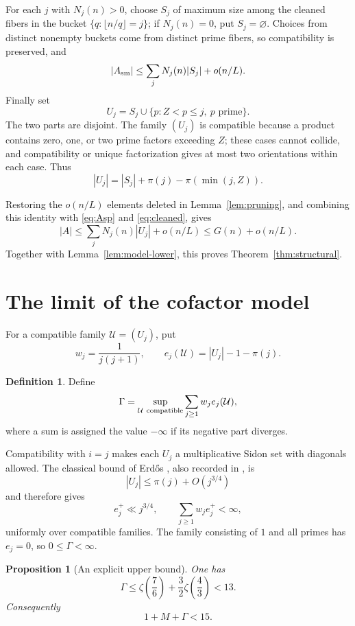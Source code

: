 \documentclass[11pt,reqno]{article}
\newtheorem{proposition}[theorem]{Proposition}
\theoremstyle{definition}
\newtheorem{definition}[theorem]{Definition}
\newcommand{\Ucal}{\mathcal U}
\begin{document}
For each \(j\) with \(N_j(n)>0\), choose \(S_j\) of maximum size among the
cleaned fibers in the bucket \(\{q:\lfloor n/q\rfloor=j\}\); if
\(N_j(n)=0\), put \(S_j=\varnothing\).  Choices from distinct nonempty
buckets come from distinct prime fibers, so compatibility is preserved, and
\[
  |A_{\rm sm}|
  \leq\sum_jN_j(n)|S_j|+o(n/L).
\]
Finally set
\[
  U_j=S_j\cup\{p:Z<p\leq j,\ p\text{ prime}\}.
\]
The two parts are disjoint.  The family \((U_j)\) is compatible because a
product contains zero, one, or two prime factors exceeding \(Z\); these
cases cannot collide, and compatibility or unique factorization gives at
most two orientations within each case.  Thus
\[
  |U_j|=|S_j|+\pi(j)-\pi(\min(j,Z)).
\]

Restoring the \(o(n/L)\) elements deleted in Lemma~\ref{lem:pruning}, and
combining this identity with \eqref{eq:Asp} and \eqref{eq:cleaned}, gives
\[
  |A|\leq\sum_jN_j(n)|U_j|+o(n/L)\leq G(n)+o(n/L).
\]
Together with Lemma~\ref{lem:model-lower}, this proves
Theorem~\ref{thm:structural}.

\section{The limit of the cofactor model}\label{sec:limit}

For a compatible family \(\Ucal=(U_j)\), put
\[
  w_j=\frac1{j(j+1)},\qquad
  e_j(\Ucal)=|U_j|-1-\pi(j).
\]

\begin{definition}\label{def:gamma}
Define
\[
  \Gamma=\sup_{\Ucal\ {\rm compatible}}
  \sum_{j\geq1}w_je_j(\Ucal),
\]
where a sum is assigned the value \(-\infty\) if its negative part diverges.
\end{definition}

Compatibility with \(i=j\) makes each \(U_j\) a multiplicative Sidon set
with diagonals allowed.  The classical bound of Erd\H{o}s
\cite{Erdos1938Sequences}, also recorded in
\cite[p.~252]{Erdos1964Multiplicative}, is
\[
  |U_j|\leq\pi(j)+O(j^{3/4})
\]
and therefore gives
\begin{equation}\label{eq:positive}
  e_j^+\ll j^{3/4},
  \qquad \sum_{j\geq1}w_je_j^+<\infty,
\end{equation}
uniformly over compatible families.  The family consisting of \(1\) and all
primes has \(e_j=0\), so \(0\leq\Gamma<\infty\).

\begin{proposition}[An explicit upper bound]\label{prop:explicit-upper}
One has
\[
  \Gamma
  \leq \zeta\left(\frac76\right)
      +\frac32\zeta\left(\frac43\right)
  <13.
\]
Consequently
\[
  1+M+\Gamma<15.
\]
\end{proposition}
\end{document}
